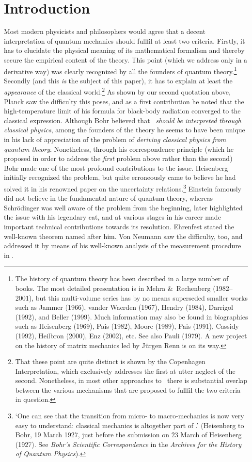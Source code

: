 \documentclass[12pt,titlepage]{article}
\begin{document}
\section{Introduction}\label{S1}
Most modern physicists and philosophers would agree that a decent interpretation of quantum mechanics should fullfil at least two criteria. Firstly, it has to elucidate  the physical meaning of its mathematical formalism and thereby secure the empirical content of the theory. This point (which we address only in a derivative way) was clearly recognized by all the founders of quantum theory.\footnote{The history of quantum theory has been described in a large number of books. The most detailed presentation is in Mehra \&\ Rechenberg (1982--2001), but this multi-volume series has by no means superseded smaller works such as Jammer (1966),  vander Waerden (1967), Hendry (1984), Darrigol (1992), and Beller (1999). Much information may also be found in biographies such as Heisenberg (1969), Pais (1982), Moore (1989), Pais (1991), Cassidy (1992), Heilbron (2000), Enz (2002), etc. See also Pauli (1979). A new project on the history of matrix mechanics led by J\"{u}rgen Renn is on its way.\label{historybooks}} 
Secondly (and this {\it is}  the subject of this paper), it has to explain at least the {\it appearance} of the classical world.\footnote{That these point are quite distinct is shown by the Copenhagen Interpretation, which exclusively addresses the first at utter neglect of the second. Nonetheless, in most other approaches to \qm\ there is substantial overlap between the various mechanisms that are proposed to fullfil the two criteria in question.}
 As shown by our second quotation above, Planck saw the difficulty this poses, and 
as a first contribution he noted that the high-temperature limit of his formula for black-body radiation converged to the classical expression. 
 Although Bohr believed that {\it \qm\ should be interpreted through classical physics}, among the founders of the theory he seems to have been unique in his lack of appreciation of the problem of {\it deriving classical physics from quantum theory}. Nonetheless, through his correspondence principle (which he proposed in order to address the {\it first} problem above rather than the second) Bohr made one of the most profound contributions to the issue.
Heisenberg initially recognized the problem, but quite erroneously came to believe he had solved it in his renowned paper on the uncertainty relations.\footnote{`One can see that the transition from micro- to macro-mechanics is now very easy to understand: classical mechanics is altogether part of \qm.' (Heisenberg to Bohr, 19 March 1927, just before 
the submission on 23 March of Heisenberg (1927). See {\it Bohr's Scientific Correspondence} in the {\it Archives for the History of Quantum Physics}).}
Einstein famously did not believe in the fundamental nature of quantum theory, whereas Schr\"{o}dinger was well aware of the problem from the beginning, later highlighted the issue with his legendary cat, and at various stages in his career made  important technical contributions towards its resolution. Ehrenfest stated the well-known theorem named after him.  Von Neumann saw the difficulty, too, and addressed it by means of his well-known analysis of the measurement procedure in \qm. 
\end{document}
